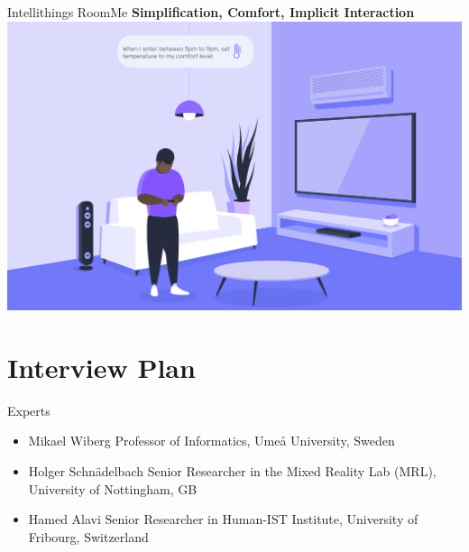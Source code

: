 \documentclass[10pt]{beamer}
\begin{document}
\begin{frame}{Intellithings RoomMe}
	\textbf{Simplification, Comfort, Implicit Interaction}\\
	\vspace{3mm}
	\includegraphics[width=\textwidth]{images/1.png}
\end{frame}


\section{Interview Plan}


\begin{frame}{Experts}
	\begin{itemize}
        \pause{}
		\item Mikael Wiberg Professor of Informatics, Umeå University, Sweden
		\pause{}
		\item Holger Schnädelbach Senior Researcher in the Mixed Reality Lab (MRL), University of Nottingham, GB
		\pause{}
		\item Hamed Alavi Senior Researcher in Human-IST Institute, University of Fribourg, Switzerland
	\end{itemize}	
\end{frame}

\end{document}
